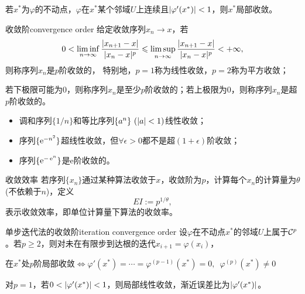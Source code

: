 \begin{corollary}
    若$x^*$为$\varphi$的不动点，$\varphi$在$x^*$某个邻域$U$上连续且$\lvert\varphi'(x^*)\rvert < 1$，则$x^*$局部收敛。
\end{corollary}

\begin{definition}
    {收敛阶}{convergence order}
    给定收敛序列$x_n \to x$，若
    \begin{equation}
        0 < \liminf_{n\to\infty}\frac{\lvert x_{n+1} - x\rvert}{\lvert x_n - x\rvert^p} \leqslant \limsup_{n\to\infty}\frac{\lvert x_{n+1} - x\rvert}{\lvert x_n - x\rvert^p} < +\infty,
    \end{equation}
    则称序列$x_n$是$p$阶收敛的，
    特别地，$p = 1$称为线性收敛，$p = 2$称为平方收敛；

    若下极限可能为0，则称序列$x_n$是至少$p$阶收敛的；若上极限为0，则称序列$x_n$是超$p$阶收敛的。
\end{definition}

\begin{example}
    {}{}
    \begin{itemize}
        \item 调和序列$\{1/n\}$和等比序列$\{a^n\}~(\lvert a\rvert < 1)$线性收敛；
        \item 序列$\{\mathop{}\!\mathrm{e}^{-n^2}\}$超线性收敛，但$\forall\epsilon > 0$都不是超$(1 + \epsilon)$阶收敛；
        \item 序列$\{\mathop{}\!\mathrm{e}^{-\mathop{}\!\mathrm{e}^n}\}$是e阶收敛的。
    \end{itemize}
\end{example}

\begin{definition}
    {收敛效率}{}
    若序列$\{x_n\}$通过某种算法收敛于$x$，收敛阶为$p$，计算每个$x_n$的计算量为$\theta$ (不依赖于$n$)，定义
    \begin{equation}\label{eq:na-efficiency-index}
        EI := p^{1/\theta},
    \end{equation}
    表示收敛效率，即单位计算量下算法的收敛率。
\end{definition}

\begin{theorem}
    {单步迭代法的收敛阶}{iteration convergence order}
    设$\varphi$在不动点$x^*$的邻域$U$上属于$\mathcal{C}^p$。若$p \geq 2$，则对未在有限步到达根的迭代$x_{i+1} = \varphi(x_i)$，
    \begin{center}
        在$x^*$处$p$阶局部收敛$\iff \varphi'(x^*) = \cdots = \varphi^{(p-1)}(x^*) = 0,\enspace\varphi^{(p)}(x^*) \neq 0$
    \end{center}
    对$p = 1$，若$0 < \lvert\varphi'(x^*)\rvert < 1$，则局部线性收敛，渐近误差比为$\lvert\varphi'(x^*)\rvert$。
\end{theorem}

